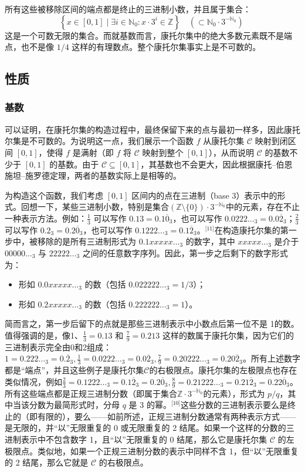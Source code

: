 所有这些被移除区间的端点都是终止的三进制小数，并且属于集合：
$$
\left\{ x \in [0,1] \mid \exists i \in \mathbb{N}_0: x \cdot 3^i \in \mathbb{Z} \right\} \quad \left( \subset \mathbb{N}_0 \cdot 3^{-\mathbb{N}_0} \right)~
$$
这是一个可数无限的集合。而就基数而言，康托尔集中的绝大多数元素既不是端点，也不是像 $1/4$ 这样的有理数点。整个康托尔集事实上是不可数的。
\subsection{性质}
\subsubsection{基数}
可以证明，在康托尔集的构造过程中，最终保留下来的点与最初一样多，因此康托尔集是不可数的。为说明这一点，我们展示一个函数 $f$ 从康托尔集 $\mathcal{C}$ 映射到闭区间 $[0,1]$，使得 $f$ 是满射（即 $f$ 将 $\mathcal{C}$ 映射到整个 $[0,1]$），从而说明 $\mathcal{C}$ 的基数不少于 $[0,1]$ 的基数。由于 $\mathcal{C} \subseteq [0,1]$，其基数也不会更大，因此根据康托–伯恩施坦–施罗德定理，两者的基数实际上是相等的。

为构造这个函数，我们考虑 $[0,1]$ 区间内的点在三进制（base 3）表示中的形式。回想一下，某些三进制小数，特别是集合$\left( \mathbb{Z} \setminus \{0\} \right) \cdot 3^{-\mathbb{N}_0}$中的元素，存在不止一种表示方法。例如：$\frac{1}{3}$ 可以写作 $0.13 = 0.1\overline{0}_3$，也可以写作 $0.0222\ldots_3 = 0.0\overline{2}_3$；$\frac{2}{3}$ 可以写作 $0.2_3 = 0.2\overline{0}_3$，也可以写作 $0.1222\ldots_3 = 0.1\overline{2}_3$。\(^\text{[11]}\)在构造康托尔集的第一步中，被移除的是所有三进制形式为 $0.1xxxxx\ldots_3$ 的数字，其中 $xxxxx\ldots_3$ 是介于 $00000\ldots_3$ 与 $22222\ldots_3$ 之间的任意数字序列。因此，第一步之后剩下的数字形式为：
\begin{itemize}
\item 形如 $0.0xxxxx\ldots_3$ 的数（包括 $0.022222\ldots_3 = 1/3$）；
\item 形如 $0.2xxxxx\ldots_3$ 的数（包括 $0.222222\ldots_3 = 1$）。
\end{itemize}
简而言之，第一步后留下的点就是那些三进制表示中小数点后第一位不是 1的数。值得强调的是，像1、$\frac{1}{3} = 0.13$ 和 $\frac{7}{9} = 0.213$ 这样的数属于康托尔集，因为它们的三进制表示完全由0和2组成：$1 = 0.222\ldots_3 = 0.\overline{2}_3,\frac{1}{3} = 0.0222\ldots_3 = 0.0\overline{2}_3 ,\frac{7}{9} = 0.20222\ldots_3 = 0.20\overline{2}_3 $。所有上述数字都是“端点”，并且这些例子是康托尔集$\mathcal{C}$的右极限点。康托尔集的左极限点也存在类似情况，例如$\frac{2}{3} = 0.1222\ldots_3 = 0.1\overline{2}_3 = 0.2\overline{0}_3,\frac{8}{9} = 0.21222\ldots_3 = 0.21\overline{2}_3 = 0.22\overline{0}_3$。所有这些端点都是正规三进制分数（即属于集合$\mathbb{Z} \cdot 3^{-\mathbb{N}_0}$的元素），形式为 $p/q$，其中当该分数为最简形式时，分母 $q$ 是 3 的幂。\(^\text{[10]}\)这些分数的三进制表示要么是终止的（即有限的），要么——如前所述，正规三进制分数通常有两种表示方式——是无限的，并“以”无限重复的 0 或无限重复的 2 结尾。如果一个这样的分数的三进制表示中不包含数字 1，且“以”无限重复的 0 结尾，那么它是康托尔集 $\mathcal{C}$ 的左极限点。类似地，如果一个正规三进制分数的表示中同样不含 1，但“以”无限重复的 2 结尾，那么它就是 $\mathcal{C}$ 的右极限点。

